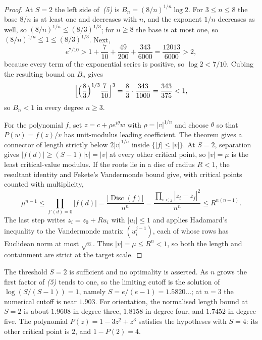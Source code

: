 \documentclass[11pt]{article}
\begin{document}
\begin{proof}
At $S=2$ the left side of~\emph{(5)} is $B_n=(8/n)^{1/n}\log2$.  For
$3\le n\le8$ the base $8/n$ is at least one and decreases with $n$, and the
exponent $1/n$ decreases as well, so $(8/n)^{1/n}\le(8/3)^{1/3}$; for $n\ge8$
the base is at most one, so $(8/n)^{1/n}\le1\le(8/3)^{1/3}$.  Next,
\[
 e^{7/10}>1+\frac7{10}+\frac{49}{200}+\frac{343}{6000}
        =\frac{12013}{6000}>2,
\]
because every term of the exponential series is positive, so $\log2<7/10$.
Cubing the resulting bound on $B_n$ gives
\[
 \Bigl[\Bigl(\frac83\Bigr)^{1/3}\frac7{10}\Bigr]^{3}
 =\frac83\cdot\frac{343}{1000}=\frac{343}{375}<1,
\]
so $B_n<1$ in every degree $n\ge3$.

For the polynomial $f$, set $z=c+\rho e^{i\theta}w$ with
$\rho=|v|^{1/n}$ and choose $\theta$ so that $P(w)=f(z)/v$ has
unit-modulus leading coefficient.  The theorem gives a connector of length
strictly below $2|v|^{1/n}$ inside $\{|f|\le|v|\}$.  At $S=2$, separation
gives $|f(d)|\ge(S-1)|v|=|v|$ at every other critical point, so $|v|=\mu$ is
the least critical-value modulus.  If the roots lie in a disc of radius
$R<1$, the resultant identity and Fekete's Vandermonde bound give, with
critical points counted with multiplicity,
\[
 \mu^{n-1}
 \le \prod_{f'(d)=0}|f(d)|
 =\frac{|\operatorname{Disc}(f)|}{n^n}
 =\frac{\prod_{i<j}|z_i-z_j|^2}{n^n}
 \le R^{n(n-1)}.
\]
The last step writes $z_i=z_0+Ru_i$ with $|u_i|\le1$ and applies Hadamard's
inequality to the Vandermonde matrix $(u_i^{j-1})$, each of whose rows has
Euclidean norm at most $\sqrt n$.  Thus $|v|=\mu\le R^n<1$, so both the length
and containment are strict at the target scale.
\end{proof}

The threshold $S=2$ is sufficient and no optimality is asserted.  As $n$ grows
the first factor of \emph{(5)} tends to one, so the limiting cutoff is the
solution of $\log(S/(S-1))=1$, namely $S=e/(e-1)=1.5820\ldots$; at $n=3$ the
numerical cutoff is near $1.903$.  For orientation, the normalised length bound at
$S=2$ is about $1.9608$ in degree three, $1.8158$ in degree four, and
$1.7452$ in degree five.  The polynomial $P(z)=1-3z^2+z^3$ satisfies the
hypotheses with $S=4$: its other critical point is $2$, and $1-P(2)=4$.
\end{document}

